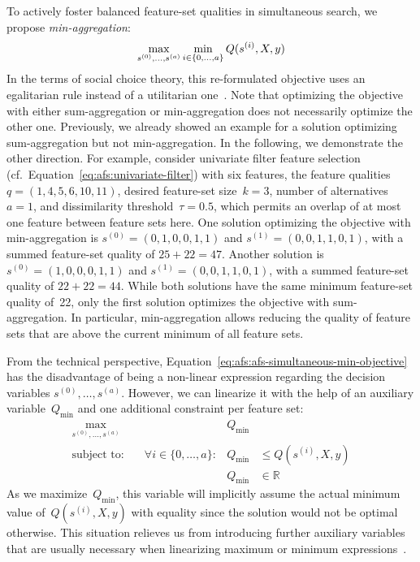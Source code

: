 \documentclass{article}
\theoremstyle{definition}
\begin{document}
To actively foster balanced feature-set qualities in simultaneous search, we propose \emph{min-aggregation}:
%
\begin{equation}
	\max_{s^{(0)}, \dots, s^{(a)}} \min_{i \in \{0, \dots, a\}} Q(s^{(i)},X,y) \\
	\label{eq:afs:afs-simultaneous-min-objective}
\end{equation}
%
In the terms of social choice theory, this re-formulated objective uses an egalitarian rule instead of a utilitarian one~\cite{myerson1981utilitarianism}.
Note that optimizing the objective with either sum-aggregation or min-aggregation does not necessarily optimize the other one.
Previously, we already showed an example for a solution optimizing sum-aggregation but not min-aggregation.
In the following, we demonstrate the other direction.
For example, consider univariate filter feature selection (cf.~Equation~\ref{eq:afs:univariate-filter}) with six features, the feature qualities~$q = (1,4,5,6,10,11)$, desired feature-set size~$k=3$, number of alternatives~$a=1$, and dissimilarity threshold~$\tau = 0.5$, which permits an overlap of at most one feature between feature sets here.
One solution optimizing the objective with min-aggregation is $s^{(0)} = (0,1,0,0,1,1)$ and $s^{(1)} = (0,0,1,1,0,1)$, with a summed feature-set quality of $25+22=47$.
Another solution is $s^{(0)} = (1,0,0,0,1,1)$ and $s^{(1)} = (0,0,1,1,0,1)$, with a summed feature-set quality of $22+22=44$.
While both solutions have the same minimum feature-set quality of~22, only the first solution optimizes the objective with sum-aggregation.
In particular, min-aggregation allows reducing the quality of feature sets that are above the current minimum of all feature sets.

From the technical perspective, Equation~\ref{eq:afs:afs-simultaneous-min-objective} has the disadvantage of being a non-linear expression regarding the decision variables $s^{(0)}, \dots, s^{(a)}$.
However, we can linearize it with the help of an auxiliary variable~$Q_{\text{min}}$ and one additional constraint per feature set:
%
\begin{equation}
	\begin{aligned}
		\max_{s^{(0)}, \dots, s^{(a)}} &\quad &Q_{\text{min}} & \\
		\text{subject to:} &\quad \forall i \in \{0, \dots, a\}: &Q_{\text{min}} &\leq Q(s^{(i)},X,y) \\
		&\quad & Q_{\text{min}} &\in \mathbb{R}
	\end{aligned}
	\label{eq:afs:afs-simultaneous-min-objective-linear}
\end{equation}
%
As we maximize~$Q_{\text{min}}$, this variable will implicitly assume the actual minimum value of~$Q(s^{(i)},X,y)$ with equality since the solution would not be optimal otherwise.
This situation relieves us from introducing further auxiliary variables that are usually necessary when linearizing maximum or minimum expressions~\cite{mosek2022modeling}.
\end{document}
